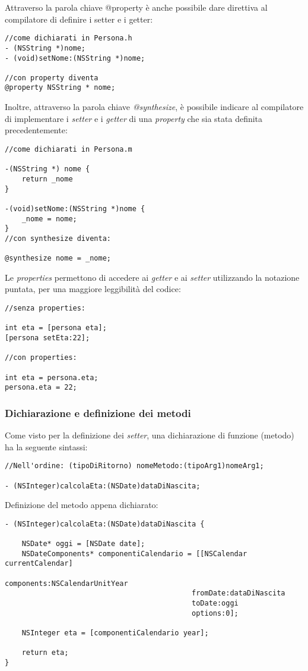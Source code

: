 \bigskip
\bigskip
\bigskip
Attraverso la parola chiave @property è anche possibile dare direttiva al compilatore di definire i setter e i getter:
\lstset{language=[Objective]C, breakindent=40pt, breaklines}
\begin{lstlisting}
//come dichiarati in Persona.h
- (NSString *)nome;
- (void)setNome:(NSString *)nome;

//con property diventa
@property NSString * nome;
\end{lstlisting}
\newpage
Inoltre, attraverso la parola chiave \textit{@synthesize}, è possibile indicare al compilatore di implementare i \textit{setter} e i \textit{getter} di una \textit{property} che sia stata definita precedentemente:
\lstset{language=[Objective]C, breakindent=40pt, breaklines}
\begin{lstlisting}
//come dichiarati in Persona.m

-(NSString *) nome {
	return _nome
}

-(void)setNome:(NSString *)nome {
	_nome = nome;
}
//con synthesize diventa:

@synthesize nome = _nome; 
\end{lstlisting}
Le \textit{properties} permettono di accedere ai \textit{getter} e ai \textit{setter} utilizzando la notazione puntata, per una maggiore leggibilità del codice:
\lstset{language=[Objective]C, breakindent=40pt, breaklines}
\begin{lstlisting}
//senza properties: 

int eta = [persona eta]; 
[persona setEta:22]; 

//con properties: 

int eta = persona.eta;
persona.eta = 22;
\end{lstlisting}
\newpage
\subsubsection{Dichiarazione e definizione dei metodi}
Come visto per la definizione dei \textit{setter}, una dichiarazione di funzione (metodo) ha la seguente sintassi: 
\lstset{language=[Objective]C, breakindent=40pt, breaklines}
\begin{lstlisting}
//Nell'ordine: (tipoDiRitorno) nomeMetodo:(tipoArg1)nomeArg1;

- (NSInteger)calcolaEta:(NSDate)dataDiNascita;
\end{lstlisting}
Definizione del metodo appena dichiarato: 
\lstset{language=[Objective]C, breakindent=40pt, breaklines}
\begin{lstlisting}
- (NSInteger)calcolaEta:(NSDate)dataDiNascita {

	NSDate* oggi = [NSDate date];
	NSDateComponents* componentiCalendario = [[NSCalendar currentCalendar] 
                                   			components:NSCalendarUnitYear 
                                   			fromDate:dataDiNascita
                                   			toDate:oggi
                                   			options:0];
	
	NSInteger eta = [componentiCalendario year];
	
	return eta;
}
\end{lstlisting}
